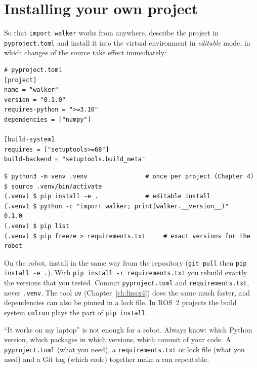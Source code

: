 \section*{Installing your own project}
So that \texttt{import walker} works from anywhere, describe the project in \texttt{pyproject.toml} and install it into the virtual environment in \emph{editable} mode, in which changes of the source take effect immediately:
\begin{verbatim}
# pyproject.toml
[project]
name = "walker"
version = "0.1.0"
requires-python = ">=3.10"
dependencies = ["numpy"]

[build-system]
requires = ["setuptools>=68"]
build-backend = "setuptools.build_meta"
\end{verbatim}
\begin{verbatim}
$ python3 -m venv .venv                # once per project (Chapter 4)
$ source .venv/bin/activate
(.venv) $ pip install -e .             # editable install
(.venv) $ python -c "import walker; print(walker.__version__)"
0.1.0
(.venv) $ pip list
(.venv) $ pip freeze > requirements.txt     # exact versions for the robot
\end{verbatim}
On the robot, install in the same way from the repository (\verb!git pull! then \verb!pip install -e .!). With \verb!pip install -r requirements.txt! you rebuild exactly the versions that you tested. Commit \texttt{pyproject.toml} and \texttt{requirements.txt}, never \texttt{.venv}. The tool \texttt{uv} (Chapter~\ref{ch:linux4}) does the same much faster, and dependencies can also be pinned in a lock file. In ROS~2 projects the build system \texttt{colcon} plays the part of \texttt{pip install}.

\begin{keyidea}
``It works on my laptop'' is not enough for a robot. Always know: which Python version, which packages in which versions, which commit of your code. A \texttt{pyproject.toml} (what you need), a \texttt{requirements.txt} or lock file (what you used) and a Git tag (which code) together make a run repeatable.
\end{keyidea}

